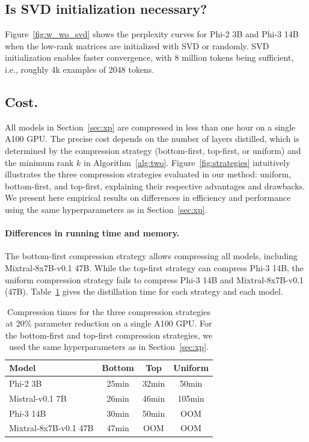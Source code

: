 \subsection{Is SVD initialization necessary?}
Figure~\ref{fig:w_wo_svd} shows the perplexity curves for Phi-2 3B and Phi-3 14B when the low-rank matrices are
initialized with SVD or randomly. SVD initialization enables faster
convergence, with 8 million tokens being sufficient, i.e., roughly
4k examples of 2048 tokens.

\subsection{Cost.}
All models in Section~\ref{sec:xp} are compressed in less than one hour on a single A100 GPU. The precise cost depends on the number of layers distilled, which is determined by the compression strategy (bottom-first, top-first, or uniform) and the minimum rank $k$ in Algorithm~\ref{alg:two}. Figure~\ref{fig:strategies} intuitively illustrates the three compression strategies evaluated in our method: uniform, bottom-first, and top-first, explaining their respective advantages and drawbacks. We present here empirical results on differences in efficiency and performance using the same hyperparameters as in Section~\ref{sec:xp}.

\paragraph{Differences in running time and memory.}
The bottom-first compression strategy allows compressing all models, including Mixtral-8x7B-v0.1 47B. While the top-first strategy can compress Phi-3 14B, the uniform compression strategy fails to compress Phi-3 14B and Mixtral-8x7B-v0.1 (47B). Table~\ref{tab:ctime-ch2} gives the distillation time for each strategy and each model.

\begin{table}[!ht]
    {\small{
    \begin{tabular}{lccc}
    \toprule
    \textbf{Model} & \textbf{Bottom} & \textbf{Top} & \textbf{Uniform} \\
    \midrule
    Phi-2 3B & 25min & 32min & 50min \\
    Mistral-v0.1 7B & 26min & 46min & 105min \\
    Phi-3 14B & 30min & 50min & OOM \\
    Mixtral-8x7B-v0.1 47B & 47min & OOM & OOM \\
    \bottomrule
    \end{tabular}
    }}
    \caption{Compression times for the three compression strategies at 20\% parameter reduction on a single A100 GPU. For the bottom-first and top-first compression strategies, we used the same hyperparameters as in Section~\ref{sec:xp}.}
    \label{tab:ctime-ch2}
\end{table}

